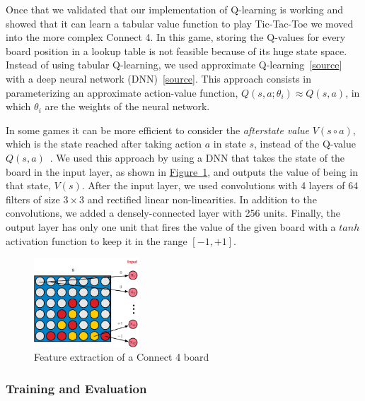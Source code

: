 \documentclass{article}
\newcommand{\GithubURL}[1]{[\href{https://github.com/davidrobles/mlnd-capstone-code/blob/master/#1}{source}]}
\begin{document}
Once that we validated that our implementation of Q-learning is working and showed that it can learn
a tabular value function to play Tic-Tac-Toe we moved into the more complex Connect 4. In this game,
storing the Q-values for every board position in a lookup table is not feasible because of its huge
state space. Instead of using tabular Q-learning, we used approximate
Q-learning~\GithubURL{capstone/rl/learners/qlearning_approx.py} with a deep neural network
(DNN)~\GithubURL{capstone/rl/value_functions/c4deepnetwork.py}. This approach consists in
parameterizing an approximate action-value function, $Q(s,a;\theta_i) \approx Q(s,a)$, in which
$\theta_i$ are the weights of the neural network.

In some games it can be more efficient to consider the \emph{afterstate value} $V(s \circ a)$, which
is the state reached after taking action $a$ in state $s$, instead of the Q-value $Q(s,
a)$~\citep{Sutton1998RL}. We used this approach by using a DNN that takes the state of the board in
the input layer, as shown in \hyperref[fig:c4-dnn-input] {Figure~\ref*{fig:c4-dnn-input}}, and
outputs the value of being in that state, $V(s)$. After the input layer, we used convolutions with 4
layers of 64 filters of size $3\times3$ and rectified linear non-linearities. In addition to the
convolutions, we added a densely-connected layer with 256 units. Finally, the output layer has only
one unit that fires the value of the given board with a $tanh$ activation function to keep it in the
range $[-1, +1]$.



\begin{figure}[!h]
    \centering
    \includegraphics[width=0.35\textwidth]{figures/c4-dnn-input.pdf}
    \caption{Feature extraction of a Connect 4 board}
    \label{fig:c4-dnn-input}
\end{figure}

\subsubsection{Training and Evaluation}
\end{document}
